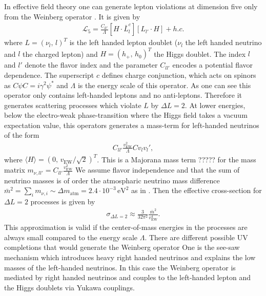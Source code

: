 \documentclass[13pt,a4paper,titlepage]{article}
\begin{document}
In effective field theory one can generate lepton violations at dimension five only from the
Weinberg operator \cite{Weinberg_operator_original_PhysRevLett.43.1566}. It is given by \cite[eq. 2]{Weinberg_at_colliders_Fuks_2021}
\begin{align}
\mathcal{L}_5 = \frac{C_{l l'}}{\Lambda} [H \cdot \bar{L}^c_l] [L_{l'} \cdot H] + h.c.
\end{align}
where $L = (\nu_l,\, l)^T$ is the left handed lepton doublet ($\nu_l$ the left handed neutrino and $l$ the charged lepton) and $H = (h_+,\, h_0)^T$ the Higgs doublet. The index $l$ and $l'$ denote the flavor index and the parameter $C_{l l'}$ encodes a potential flavor dependence.
The superscript $c$ defines charge conjunction, which acts on spinors as $C \psi C = i \gamma^2 \psi^*$
and $\Lambda$ is the energy scale of this operator.
As one can see this operator only contains left-handed leptons and no anti-leptons. Therefore
it generates scattering processes which violate $L$ by $\Delta L = 2$.
At lower energies, below the electro-weak phase-transition where the Higgs field takes a vacuum expectation value, this operators generates a mass-term for left-handed neutrinos of the form
\begin{align}
C_{ll'} \frac{v_{\mathrm{EW}}^2}{\Lambda} C v_l v_l',
\end{align}
where $\langle H \rangle = (0,\, v_{\mathrm{EW}} / \sqrt{2})^T$.
This is a Majorana mass term ????? for the mass matrix $m_{\nu, ll'} = C_{ll'} \frac{v_{\mathrm{EW}}^2}{\Lambda}$
We assume flavor independence and that the sum of neutrino masses
is of order the atmospharic neutrino mass difference $\bar{m}^2 = \sum_i m_{\nu, i} \sim \Delta m_{\mathrm{atm}} = 2.4 \cdot 10^{-3} \, \mathrm{eV}^2$ as in \cite{Kusenko_2015_Axion_Leptogenesis}.
Then the effective cross-section for $\Delta L = 2$ processes
is given by \cite[eq. 9]{Kusenko_2015_Axion_Leptogenesis}
\begin{align}
\label{eq:weinberg_rate}
\sigma_{\Delta L = 2} \approx \frac{3}{32 \pi^2} \frac{\bar{m}^2}{v_{\mathrm{EW}}^4}.
\end{align}
This approximation is valid if the center-of-mass energies in the processes are always small compared to the energy scale $\Lambda$.
There are different possible UV completions that would generate the Weinberg operator
One is the see-saw mechanism which introduces heavy right handed neutrinos and explains the low masses of the left-handed neutrinos.
In this case the Weinberg operator is mediated by right handed neutrinos and
couples to the left-handed lepton and the Higgs doublets via Yukawa couplings.
\end{document}
